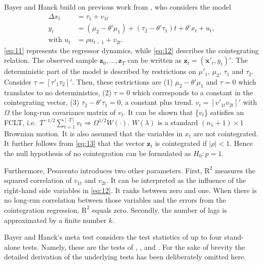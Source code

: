 \documentclass[12pt,a4paper]{article}
\begin{document}
Bayer and Hanck build on previous work from \textcite{Pesavento_2004},
who considers the model \begin{align}
\Delta x_t &= \tau_1 + v_{1t} \label{eq:11} \\
y_t &= (\mu_2 - \theta' \mu_1) + (\tau_2 - \theta' \tau_1) t + \theta' x_t + u_t, \label{eq:12} \\
\text{with } u_t &= \rho u_{t-1} + v_{2t}. \label{eq:13}
\end{align} \eqref{eq:11} represents the regressor dynamics, while
\eqref{eq:12} describes the cointegrating relation. The observed sample
\(\mathbf{z}_0,..., \mathbf{z}_T\) can be written as
\(\mathbf{z}_t = (\mathbf{x}'_t, y_t)'\). The deterministic part of the
model is described by restrictions on \(\mu'_1\), \(\mu_2\), \(\tau_1\)
and \(\tau_2\). Consider \(\tau = [\tau'_1 \tau_2]'\). Then, these
restrictions are (1) \(\mu_2 - \theta' \mu_1\) and \(\tau = 0\) which
translates to no deterministics, (2) \(\tau = 0\) which corresponds to a
constant in the cointegrating vector, (3)
\(\tau_2 - \theta' \tau_1 = 0\), a constant plus trend.
\(v_t = [v'_{1t} v_{2t}]'\) with \(\Omega\) the long-run covariance
matrix of \(v_t\). It can be shown that \{\(v_t\)\} satisfies an FCLT,
i.e.~\(T^{-1/2} \sum^{[\cdot T]}_{t=1} v_t \Rightarrow \Omega^{1/2} W(\cdot)\).
\(W(\lambda)\) is a standard \((n_1 + 1) \times 1\) Brownian motion. It
is also assumed that the variables in \(x_t\) are not cointegrated. It
further follows from \eqref{eq:13} that the vector \(\mathbf{z}_t\) is
cointegrated if \(|\rho| < 1\). Hence the null hypothesis of no
cointegration can be formulated as \(H_0: p = 1\).

Furthermore, Pesavento introduces two other parameters. First,
\(\text{R}^2\) measures the squared correlation of \(v_{1t}\) and
\(v_{2t}\). It can be interpreted as the influence of the right-hand
side variables in \eqref{eq:12}. It ranks between zero and one. When
there is no long-run correlation between those variables and the errors
from the cointegration regression, \(\text{R}^2\) equals zero. Secondly,
the number of lags is approximated by a finite number \(k\).

Bayer and Hanck's \autocite*{Bayerhanck_2012} meta test considers the
test statistics of up to four stand-alone tests. Namely, these are the
tests of \textcite{Englegranger_1987}, \textcite{Johansen_1988},
\textcite{Boswijk_1994} and \textcite{Banerjee_1998}. For the sake of
brevity the detailed derivation of the underlying tests has been
deliberately omitted here.
\end{document}
